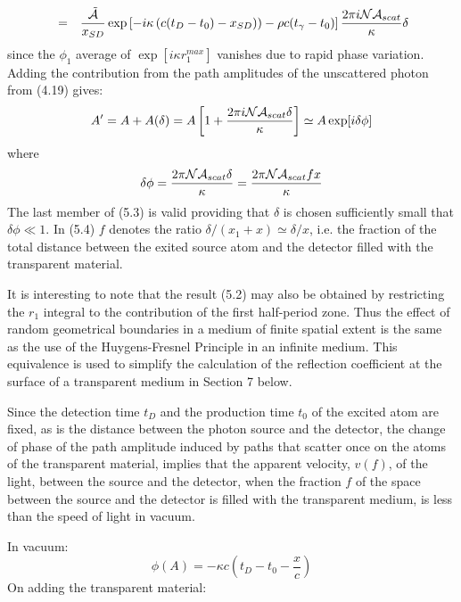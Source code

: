 \documentclass [12pt]{article}
\begin{document}
{\begin{eqnarray}
      & = & \frac{\tilde{{\cal A}}}{x_{SD}}\exp\left[ -i \kappa \left(c(t_D-t_0)- x_{SD})
   \right)-\rho c (t_{\gamma}-t_0)\right] \frac{ 2 \pi i {\cal N} {\cal A}_{scat}}{\kappa} \delta
  \end{eqnarray}
  since the  $\phi_1$ average of $\exp[i\kappa r_1^{max}]$ vanishes due to rapid phase variation. 
  Adding the contribution from the path amplitudes of the unscattered photon from (4.19) gives:
   \begin{equation}
  A' = A + A(\delta) = A \left[ 1+\frac{ 2 \pi i {\cal N} { \cal A}_{scat} \delta}
  {\kappa}\right] \simeq A \exp[i \delta \phi] 
 \end{equation}
   where 
   \begin{equation} 
\delta \phi = \frac{  2 \pi {\cal N} {\cal A}_{scat }\delta}{\kappa}
  =  \frac{  2 \pi {\cal N} {\cal A}_{scat } f x}{\kappa}
 \end{equation}
  The last member of (5.3) is valid providing that $\delta$ is chosen sufficiently small
  that $\delta \phi \ll 1$. In (5.4) $f$ denotes the ratio $\delta/(x_1+x) \simeq \delta/x$, i.e. 
  the fraction of the total distance between the exited source atom and the detector 
  filled with the transparent material.
   \par It is interesting to note that the result (5.2) may also be obtained by restricting the $r_1$
   integral to the contribution of the first half-period zone. Thus the effect of random geometrical
  boundaries in a medium of finite spatial extent is the same as the use of the Huygens-Fresnel Principle
  in an infinite medium. This equivalence is used to simplify the calculation of the reflection
   coefficient at the surface of a transparent medium in Section 7 below. 
  \par Since the detection time $t_D$ and the production time $t_0$ of the excited atom are fixed, as is the
  distance between the photon source and the detector, the change of phase of the path amplitude induced
  by paths that scatter once on the atoms of the transparent material, implies that the apparent
  velocity, $v(f)$, of the light, between the source and the detector, when the fraction $f$ of the
  space between the source and the detector is filled with the transparent medium, is less than the
  speed of light in vacuum.
 \par In vacuum:
     \begin{equation}
   \phi(A) =  - \kappa c\left(t_D-t_0-\frac{x}{c} \right)
 \end{equation}
  On adding the transparent material:
}
\end{document}
